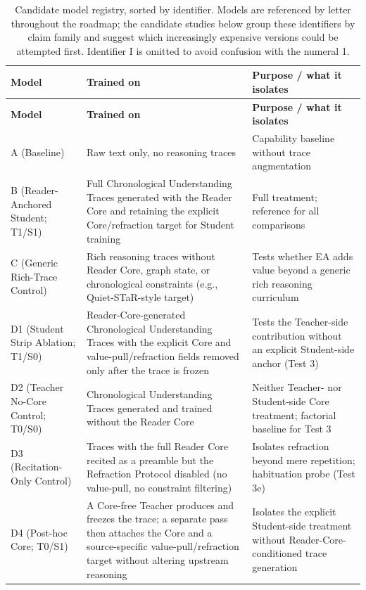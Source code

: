 \begingroup
\footnotesize
\setlength{\tabcolsep}{3pt}
\begin{longtable}{
  >{\raggedright\arraybackslash}p{3.1cm}
  >{\raggedright\arraybackslash}p{5.5cm}
  >{\raggedright\arraybackslash}p{6.4cm}}
\caption{Candidate model registry, sorted by identifier. Models are referenced by letter throughout the roadmap; the candidate studies below group these identifiers by claim family and suggest which increasingly expensive versions could be attempted first. Identifier I is omitted to avoid confusion with the numeral 1.}
\label{tab:model-registry}\\
\toprule
\textbf{Model} & \textbf{Trained on} & \textbf{Purpose / what it isolates} \\
\midrule
\endfirsthead
\toprule
\textbf{Model} & \textbf{Trained on} & \textbf{Purpose / what it isolates} \\
\midrule
\endhead
\bottomrule
\endlastfoot
        A (Baseline) & Raw text only, no reasoning traces & Capability baseline without trace augmentation \\
        B (Reader-Anchored Student; T1/S1) & Full Chronological Understanding Traces generated with the Reader Core and retaining the explicit Core/refraction target for Student training & Full treatment; reference for all comparisons \\
        C (Generic Rich-Trace Control) & Rich reasoning traces without Reader Core, graph state, or chronological constraints (e.g., Quiet-STaR-style target) & Tests whether EA adds value beyond a generic rich reasoning curriculum \\
	        D1 (Student Strip Ablation; T1/S0) & Reader-Core-generated Chronological Understanding Traces with the explicit Core and value-pull/refraction fields removed only after the trace is frozen & Tests the Teacher-side contribution without an explicit Student-side anchor (Test 3) \\
        D2 (Teacher No-Core Control; T0/S0) & Chronological Understanding Traces generated and trained without the Reader Core & Neither Teacher- nor Student-side Core treatment; factorial baseline for Test 3 \\
        D3 (Recitation-Only Control) & Traces with the full Reader Core recited as a preamble but the Refraction Protocol disabled (no value-pull, no constraint filtering) & Isolates refraction beyond mere repetition; habituation probe (Test 3e) \\
        D4 (Post-hoc Core; T0/S1) & A Core-free Teacher produces and freezes the trace; a separate pass then attaches the Core and a source-specific value-pull/refraction target without altering upstream reasoning & Isolates the explicit Student-side treatment without Reader-Core-conditioned trace generation \\

\end{longtable}
